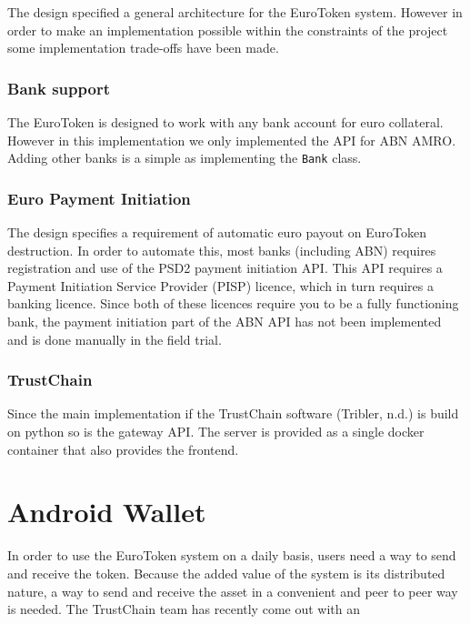 \documentclass[whitelogo]{tudelft-report}
\begin{document}
The design specified a general architecture for the EuroToken system.
However in order to make an implementation possible within the
constraints of the project some implementation trade-offs have been
made.

\subsubsection{Bank support}\label{bank-support}

The EuroToken is designed to work with any bank account for euro
collateral. However in this implementation we only implemented the API
for ABN AMRO. Adding other banks is a simple as implementing the
\texttt{Bank} class.

\subsubsection{Euro Payment Initiation}\label{euro-payment-initiation}

The design specifies a requirement of automatic euro payout on EuroToken
destruction. In order to automate this, most banks (including ABN)
requires registration and use of the PSD2 payment initiation API. This
API requires a Payment Initiation Service Provider (PISP) licence, which
in turn requires a banking licence. Since both of these licences require
you to be a fully functioning bank, the payment initiation part of the
ABN API has not been implemented and is done manually in the field
trial.

\subsubsection{TrustChain}\label{trustchain}

Since the main implementation if the TrustChain software (Tribler, n.d.)
is build on python so is the gateway API. The server is provided as a
single docker container that also provides the frontend.

\section{Android Wallet}\label{android-wallet}

In order to use the EuroToken system on a daily basis, users need a way
to send and receive the token. Because the added value of the system is
its distributed nature, a way to send and receive the asset in a
convenient and peer to peer way is needed. The TrustChain team has
recently come out with an
\end{document}
